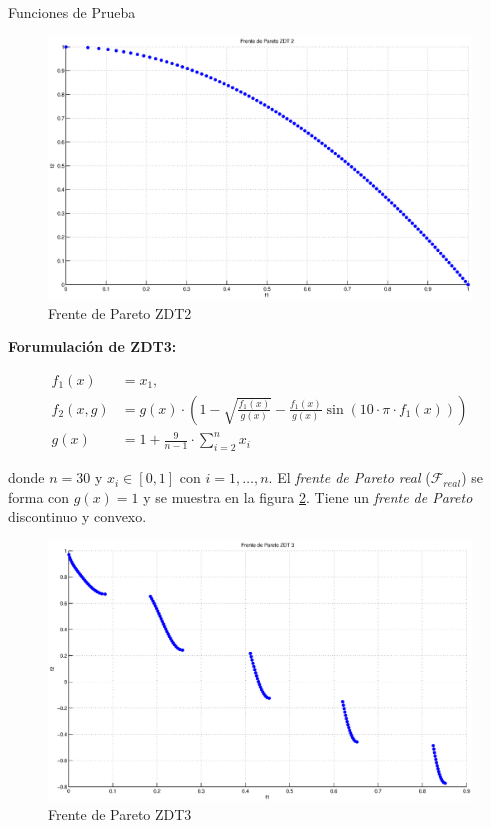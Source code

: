 \begin{chapter}{Funciones de Prueba}
\begin{figure}[h!]
 \centering
\includegraphics[scale=0.45]{ApendiceA/paretoZDT2.eps}
\caption{Frente de Pareto ZDT2}
\label{fig:ZDT2}
\end{figure} 

\textbf{Forumulaci\'on de ZDT3:}

\begin{align*}
f_1(x)&=x_1,\\
f_2(x,g)&=g(x)\cdot\left(1-\sqrt{\frac{f_1(x)}{g(x)}}-\frac{f_1(x)}{g(x)}\sin(10\cdot\pi\cdot f_1(x))\right)\\
g(x)&=1+\frac{9}{n-1}\cdot\sum_{i=2}^nx_i
\end{align*}

donde $n=30$ y $x_i\in[0,1]$ con $i=1, \ldots, n$. El \textit{frente de Pareto real} ($\mathcal{F}_{real}$) se forma con $g(x)=1$ y se muestra 
en la figura \ref{fig:ZDT3}. Tiene un {\it frente de Pareto} discontinuo y convexo.

\begin{figure}[h!]
 \centering
\includegraphics[scale=0.45]{ApendiceA/paretoZDT3.eps}
\caption{Frente de Pareto ZDT3}
\label{fig:ZDT3}
\end{figure} 


\end{chapter}
